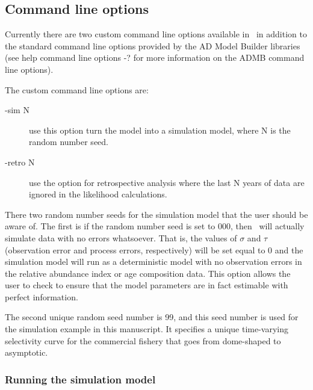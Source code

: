 \begin{multicols}{2}

\subsection{Command line options}
Currently there are two custom command line options available in \iscam\ in addition to the standard command line options provided by the AD Model Builder libraries (see help command line options -? for more information on the ADMB command line options). 

The custom command line options are:
\begin{description}
\item[-sim N] use this option turn the model into a simulation model, where N is the random number seed.

\item[-retro N] use the option for retrospective analysis where the last N years of data are ignored in the likelihood calculations.
\end{description}

There two random number seeds for the simulation model that the user should be aware of.  The first is if the random number seed is set to 000, then \iscam\ will actually simulate data with no errors whatsoever.  That is, the values of $\sigma$ and $\tau$ (observation error and process errors, respectively) will be set equal to 0 and the simulation model will run as a deterministic model with no observation errors in the relative abundance index or age composition data.  This option allows the user to check to ensure that the model parameters are in fact estimable with perfect information.


The second unique random seed number is 99, and this seed number is used for the simulation example in this manuscript.  It specifies a unique time-varying selectivity curve for the commercial fishery that goes from dome-shaped to asymptotic.

\subsubsection{Running the simulation model}


\end{multicols}
